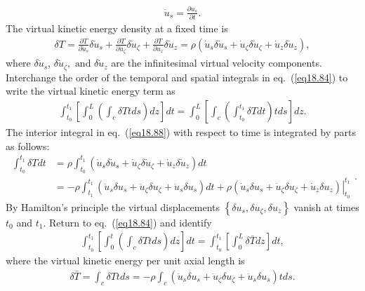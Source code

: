 \documentclass{AeroStructure-ERJohnson}
\begin{document}
\begin{align}\label{eq18.86}
\dot{u}_{s}=\frac{\partial u_{s}}{\partial t}.
\end{align}
The virtual kinetic energy density at a fixed time is
\begin{align}\label{eq18.87}
\delta T=\frac{\partial T}{\partial \dot{u}_{s}} \delta \dot{u}_{s}+\frac{\partial T}{\partial \dot{u}_{\zeta}} \delta \dot{u}_{\zeta}+\frac{\partial T}{\partial \dot{u}_{z}} \delta \dot{u}_{z}=\rho\left(\dot{u}_{s} \delta \dot{u}_{s}+\dot{u}_{\zeta} \delta \dot{u}_{\zeta}+\dot{u}_{z} \delta \dot{u}_{z}\right),
\end{align}
where $\delta \dot{u}_{s}$, $\delta \dot{u}_{\zeta},\text{ and }\delta \dot{u}_{z}$ are the infinitesimal virtual velocity components. Interchange the order of the temporal and spatial integrals in eq.~(\ref{eq18.84}) to write the virtual kinetic energy term as
\begin{align}\label{eq18.88}
\int_{t_{0}}^{t_{1}}\left[\int_{0}^{L}\left(\int_{c}\delta T t d s\right) d z\right] d t=\int_{0}^{L}\left[\int_{c}\left(\int_{t_{0}}^{t_{1}} \delta T d t\right) t d s\right] d z.
\end{align}
The interior integral in eq.~(\ref{eq18.88}) with respect to time is integrated by parts as follows:
\begin{equation}\label{eq18.89}
\begin{split}\int_{t_{0}}^{t_{1}} \delta T d t &=\rho \int_{t_{0}}^{t_{1}}\left(\dot{u}_{s} \delta \dot{u}_{s}+\dot{u}_{\zeta} \delta \dot{u}_{\zeta}+\dot{u}_{z} \delta \dot{u}_{z}\right) d t \\&=-\rho \int_{t_{1}}^{t_1}\left(\ddot{u}_{s} \delta u_{s}+\ddot{u}_{\zeta} \delta u_{\zeta}+\ddot{u}_{s} \delta u_{s}\right) d t+\left.\rho\left(\dot{u}_{s} \delta u_{s}+\dot{u}_{\zeta} \delta u_{\zeta}+\dot{u}_{z} \delta u_{z}\right)\right|_{t_{0}} ^{t_{1}}\end{split}.
\end{equation}
By Hamilton's principle the virtual displacements $\left\{\delta u_{s}, \delta u_{\zeta}, \delta u_{z}\right\}$ vanish at times $t_{0}$ and $t_{1}$. Return to eq.~(\ref{eq18.84}) and identify
\begin{align}\label{eq18.90}
\int_{t_{0}}^{t_{1}}\left[\int_{0}^{t}\left(\int_c \delta T t d s\right) d z\right] d t=\int_{t_{0}}^{t_{1}}\left[\int_{0}^{L} \delta \bar{T} d z\right] d t,
\end{align}
where the virtual kinetic energy per unit axial length is
\begin{align}\label{eq18.91}
\delta \bar{T}=\int_{c} \delta T t d s=-\rho \int_{c}\left(\ddot{u}_{s} \delta u_{s}+\ddot{u}_{\zeta} \delta u_{\zeta}+\ddot{u}_{s} \delta u_{s}\right) t d s.
\end{align}
\end{document}
